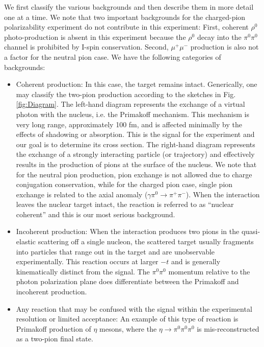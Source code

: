 We first classify the various backgrounds and then describe them in more detail one at a time.
We note that two important backgrounds for the charged-pion polarizability experiment do not contribute in this experiment:
First, coherent $\rho^0$ photo-production is absent in this
experiment because the $\rho^0$ decay into the $\pi^0\pi^0$ channel is prohibited by I-spin conservation.  Second, $\mu^+\mu^-$ production is also not a factor for the neutral pion case.
We have the following categories of backgrounds:
\begin{itemize}
\item Coherent production: In this case, the target remains intact. Generically, one may classify the two-pion production
according to the sketches in Fig.\,\ref{fig:Diagram}. The left-hand diagram represents the exchange of a virtual photon with the nucleus, i.e. the Primakoff
mechanism. This mechanism is very long range, approximately 100 fm, and is affected minimally by the effects of shadowing or absorption.  This is the signal for the
experiment and our goal is to determine its cross section.
The right-hand diagram represents the exchange of a strongly interacting particle (or trajectory) and effectively results in the production of pions at the
surface of the nucleus. We note that for the neutral pion production, pion exchange is not allowed due to charge conjugation conservation, while 
for the charged pion case, single pion exchange is related to the axial anomaly ($\gamma \pi^0 \rightarrow \pi^+ \pi^-$).  When the interaction leaves the
nuclear target intact, the reaction is referred to as ``nuclear coherent'' and this is our most serious background. 
\item Incoherent production:  When the interaction produces two pions in the quasi-elastic scattering off a single
nucleon, the scattered target usually fragments into particles that range out in the target and are unobservable experimentally. This reaction occurs at larger $-t$ and is generally
kinematically distinct from the signal. The $\pi^0\pi^0$ momentum relative to the photon polarization plane does differentiate between the Primakoff and incoherent production.
\item Any reaction that may be confused with the signal within the experimental resolution or limited acceptance:
 An example of this type of reaction is Primakoff production of $\eta$ mesons, where the $\eta\rightarrow \pi^0 \pi^0 \pi^0$  is
mis-reconstructed as a two-pion final state. 
\end{itemize}

